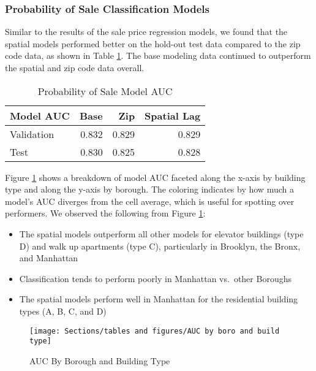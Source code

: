 \documentclass[12pt,]{article}
\providecommand{\tightlist}{%
  \setlength{\itemsep}{0pt}\setlength{\parskip}{0pt}}
\begin{document}
\hypertarget{probability-of-sale-classification-models}{%
\subsubsection{Probability of Sale Classification
Models}\label{probability-of-sale-classification-models}}

Similar to the results of the sale price regression models, we found
that the spatial models performed better on the hold-out test data
compared to the zip code data, as shown in Table
\ref{tab:ProbSaleModelAUC}. The base modeling data continued to
outperform the spatial and zip code data overall.

\begin{table}

\caption{\label{tab:Prob Model AUC}\label{tab:ProbSaleModelAUC} Probability of Sale Model AUC}
\centering
\begin{tabular}[t]{lrrr}
\toprule
Model AUC & Base & Zip & Spatial Lag\\
\midrule
Validation & 0.832 & 0.829 & 0.829\\
Test & 0.830 & 0.825 & 0.828\\
\bottomrule
\end{tabular}
\end{table}

Figure \ref{fig:AUC by boro and build type} shows a breakdown of model
AUC faceted along the x-axis by building type and along the y-axis by
borough. The coloring indicates by how much a model's AUC diverges from
the cell average, which is useful for spotting over performers. We
observed the following from Figure \ref{fig:AUC by boro and build type}:

\begin{itemize}
\tightlist
\item
  The spatial models outperform all other models for elevator buildings
  (type D) and walk up apartments (type C), particularly in Brooklyn,
  the Bronx, and Manhattan
\item
  Classification tends to perform poorly in Manhattan vs.~other Boroughs
\item
  The spatial models perform well in Manhattan for the residential
  building types (A, B, C, and D)
\end{itemize}

\begin{figure}[H]
\texttt{[image: Sections/tables and figures/AUC by boro and build type]} \caption{AUC By Borough and Building Type}\label{fig:AUC by boro and build type}
\end{figure}
\end{document}
